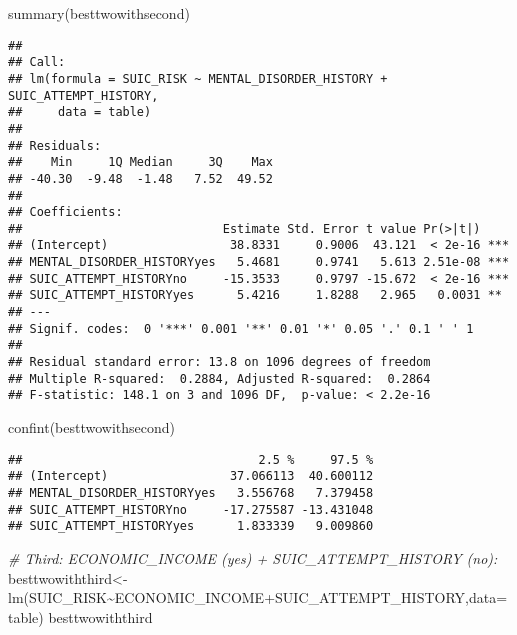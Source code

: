 \documentclass[
]{book}
\newenvironment{Shaded}{\begin{snugshade}}{\end{snugshade}}
\newcommand{\AttributeTok}[1]{\textcolor[rgb]{0.77,0.63,0.00}{#1}}
\newcommand{\CommentTok}[1]{\textcolor[rgb]{0.56,0.35,0.01}{\textit{#1}}}
\newcommand{\FunctionTok}[1]{\textcolor[rgb]{0.00,0.00,0.00}{#1}}
\newcommand{\NormalTok}[1]{#1}
\newcommand{\OtherTok}[1]{\textcolor[rgb]{0.56,0.35,0.01}{#1}}
\newcommand{\SpecialCharTok}[1]{\textcolor[rgb]{0.00,0.00,0.00}{#1}}
\begin{document}
\begin{Shaded}
\begin{Highlighting}[]
\FunctionTok{summary}\NormalTok{(besttwowithsecond)}
\end{Highlighting}
\end{Shaded}

\begin{verbatim}
## 
## Call:
## lm(formula = SUIC_RISK ~ MENTAL_DISORDER_HISTORY + SUIC_ATTEMPT_HISTORY, 
##     data = table)
## 
## Residuals:
##    Min     1Q Median     3Q    Max 
## -40.30  -9.48  -1.48   7.52  49.52 
## 
## Coefficients:
##                            Estimate Std. Error t value Pr(>|t|)    
## (Intercept)                 38.8331     0.9006  43.121  < 2e-16 ***
## MENTAL_DISORDER_HISTORYyes   5.4681     0.9741   5.613 2.51e-08 ***
## SUIC_ATTEMPT_HISTORYno     -15.3533     0.9797 -15.672  < 2e-16 ***
## SUIC_ATTEMPT_HISTORYyes      5.4216     1.8288   2.965   0.0031 ** 
## ---
## Signif. codes:  0 '***' 0.001 '**' 0.01 '*' 0.05 '.' 0.1 ' ' 1
## 
## Residual standard error: 13.8 on 1096 degrees of freedom
## Multiple R-squared:  0.2884, Adjusted R-squared:  0.2864 
## F-statistic: 148.1 on 3 and 1096 DF,  p-value: < 2.2e-16
\end{verbatim}

\begin{Shaded}
\begin{Highlighting}[]
\FunctionTok{confint}\NormalTok{(besttwowithsecond)}
\end{Highlighting}
\end{Shaded}

\begin{verbatim}
##                                 2.5 %     97.5 %
## (Intercept)                 37.066113  40.600112
## MENTAL_DISORDER_HISTORYyes   3.556768   7.379458
## SUIC_ATTEMPT_HISTORYno     -17.275587 -13.431048
## SUIC_ATTEMPT_HISTORYyes      1.833339   9.009860
\end{verbatim}

\begin{Shaded}
\begin{Highlighting}[]
\CommentTok{\# Third: ECONOMIC\_INCOME (yes) + SUIC\_ATTEMPT\_HISTORY (no):}
\NormalTok{besttwowiththird}\OtherTok{\textless{}{-}}\FunctionTok{lm}\NormalTok{(SUIC\_RISK}\SpecialCharTok{\textasciitilde{}}\NormalTok{ECONOMIC\_INCOME}\SpecialCharTok{+}\NormalTok{SUIC\_ATTEMPT\_HISTORY,}\AttributeTok{data=}\NormalTok{table)}
\NormalTok{besttwowiththird}
\end{Highlighting}
\end{Shaded}
\end{document}
